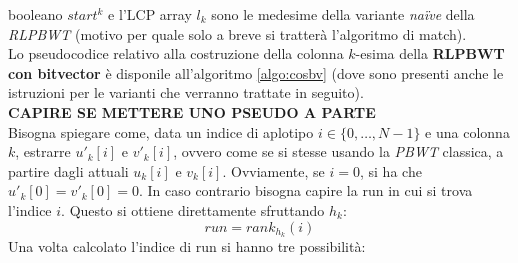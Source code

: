 booleano $start^k$ e l'LCP array $l_k$ sono le medesime della variante
\textit{na\"{i}ve} della \textit{RLPBWT} (motivo per quale solo a breve si
tratterà l'algoritmo di match).\\
Lo pseudocodice relativo alla costruzione della colonna $k$-esima della
\textbf{RLPBWT con bitvector} è disponile all'algoritmo \ref{algo:cosbv} (dove
sono presenti anche le istruzioni per le varianti che verranno trattate in
seguito).\\
\textbf{CAPIRE SE METTERE UNO PSEUDO A PARTE}\\
Bisogna spiegare come, data un indice di aplotipo $i\in\{0,\ldots,N-1\}$ e una
colonna $k$, estrarre $u'_k[i]$ e $v'_k[i]$, ovvero come se si stesse usando la
\textit{PBWT} classica, a partire dagli attuali $u_k[i]$ e $v_k[i]$. Ovviamente,
se $i=0$, si ha che $u'_k[0]=v'_k[0]=0$. In caso contrario bisogna capire la run
in cui si trova l'indice $i$. Questo si ottiene direttamente sfruttando $h_k$:
\[run = rank_{h_k}(i)\]
Una volta calcolato l'indice di run si hanno tre possibilità:
